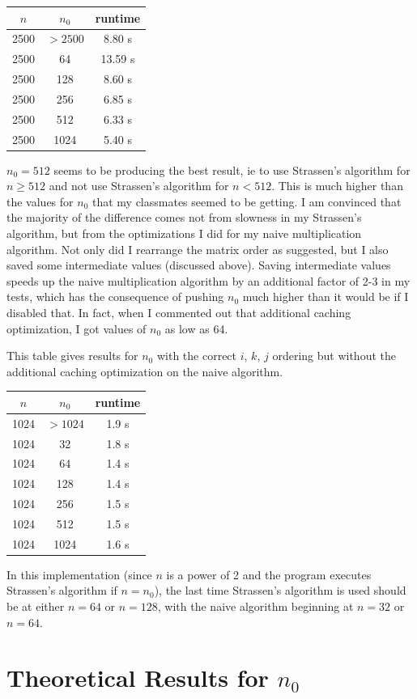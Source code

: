 \documentclass{article}
\begin{document}
\begin{center}
\begin{tabular} { |c|c|c| }
\hline
$n$ & $n_0$ & runtime \\
\hline\hline
2500 & $>2500$ & 8.80 s \\
\hline\hline
2500 & 64 &  13.59 s \\
\hline
2500 & 128 & 8.60 s \\
\hline
2500 & 256 &  6.85 s\\
\hline
2500 & 512 & 6.33 s \\ 
\hline
2500 & 1024 & 5.40 s\\
\hline
\end{tabular}
\end{center}

$n_0 = 512$ seems to be producing the best result, ie to use Strassen's algorithm for $n \geq 512$ and not use Strassen's algorithm for $n < 512$. This is much higher than the values for $n_0$ that my classmates seemed to be getting. I am convinced that the majority of the difference comes not from slowness in my Strassen's algorithm, but from the optimizations I did for my naive multiplication algorithm. Not only did I rearrange the matrix order as suggested, but I also saved some intermediate values (discussed above). Saving intermediate values speeds up the naive multiplication algorithm by an additional factor of 2-3 in my tests, which has the consequence of pushing $n_0$ much higher than it would be if I disabled that. In fact, when I commented out that additional caching optimization, I got values of $n_0$ as low as 64. 

This table gives results for $n_0$ with the correct $i$, $k$, $j$ ordering but without the additional caching optimization on the naive algorithm.
\begin{center}
\begin{tabular} { |c|c|c| }
\hline
$n$ & $n_0$ & runtime \\
\hline\hline
1024 & $>1024$ &  1.9 s\\
\hline\hline
1024 & 32 & 1.8 s \\
\hline
1024 & 64  & 1.4 s \\
\hline
1024 & 128 & 1.4 s\\
\hline
1024 & 256 & 1.5 s\\
\hline
1024 & 512 & 1.5 s \\ 
\hline
1024 & 1024 & 1.6 s\\
\hline
\end{tabular}
\end{center}
In this implementation (since $n$ is a power of 2 and the program executes Strassen's algorithm if $n = n_0$), the last time Strassen's algorithm is used should be at either $n=64$ or $n=128$, with the naive algorithm beginning at $n=32$ or $n=64$.

\section*{Theoretical Results for $n_0$} 
\end{document}
